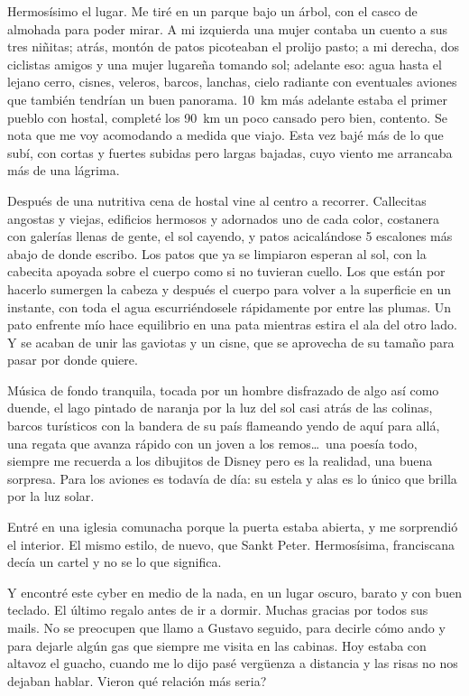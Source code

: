 Hermos\'isimo el lugar. Me tir\'e en un parque bajo un \'arbol, con el casco
de almohada para poder mirar. A mi izquierda una mujer contaba un cuento a
sus tres ni\~nitas; atr\'as, mont\'on de patos picoteaban el prolijo pasto; a
mi derecha, dos ciclistas amigos y una mujer lugare\~na tomando sol; adelante
eso: agua hasta el lejano cerro, cisnes, veleros, barcos, lanchas, cielo
radiante con eventuales aviones que tambi\'en tendr\'ian un buen panorama.
10~km m\'as adelante estaba el primer pueblo con hostal, complet\'e los
90~km un poco cansado pero bien, contento. Se nota que me voy acomodando a
medida que viajo. Esta vez baj\'e m\'as de lo que sub\'i, con cortas y fuertes
subidas pero largas bajadas, cuyo viento me arrancaba m\'as de una l\'agrima.

Despu\'es de una nutritiva cena de hostal vine al centro a recorrer. Callecitas
angostas y viejas, edificios hermosos y adornados uno de cada color, costanera
con galer\'ias llenas de gente, el sol cayendo, y patos acical\'andose 5
escalones m\'as abajo de donde escribo. Los patos que ya se limpiaron esperan al
sol, con la cabecita apoyada sobre el cuerpo como si no tuvieran cuello. Los que
est\'an por hacerlo sumergen la cabeza y despu\'es el cuerpo para volver a la
superficie en un instante, con toda el agua escurri\'endosele r\'apidamente por
entre las plumas. Un pato enfrente m\'io hace equilibrio en una pata mientras
estira el ala del otro lado. Y se acaban de unir las gaviotas y un cisne, que se
aprovecha de su tama\~no para pasar por donde quiere.

M\'usica de fondo tranquila, tocada por un hombre disfrazado de algo as\'i como
duende, el lago pintado de naranja por la luz del sol casi atr\'as de las
colinas, barcos tur\'isticos con la bandera de su pa\'is flameando yendo de
aqu\'i para all\'a, una regata que avanza r\'apido con un joven a los
remos\ldots\ una poes\'ia todo, siempre me recuerda a los dibujitos de Disney
pero es la realidad, una buena sorpresa. Para los aviones es todav\'ia de d\'ia:
su estela y alas es lo \'unico que brilla por la luz solar.

Entr\'e en una iglesia comunacha porque la puerta estaba abierta, y me
sorprendi\'o el interior. El mismo estilo, de nuevo, que Sankt Peter.
Hermos\'isima, franciscana dec\'ia un cartel y no se lo que significa.

Y encontr\'e este cyber en medio de la nada, en un lugar oscuro, barato y con
buen teclado. El \'ultimo regalo antes de ir a dormir. Muchas gracias por
todos sus mails. No se preocupen que llamo a Gustavo seguido, para decirle
c\'omo ando y para dejarle alg\'un gas que siempre me visita en las cabinas.
Hoy estaba con altavoz el guacho, cuando me lo dijo pas\'e verg\"uenza a
distancia y las risas no nos dejaban hablar. \textquestiondown Vieron qu\'e
relaci\'on m\'as seria?

